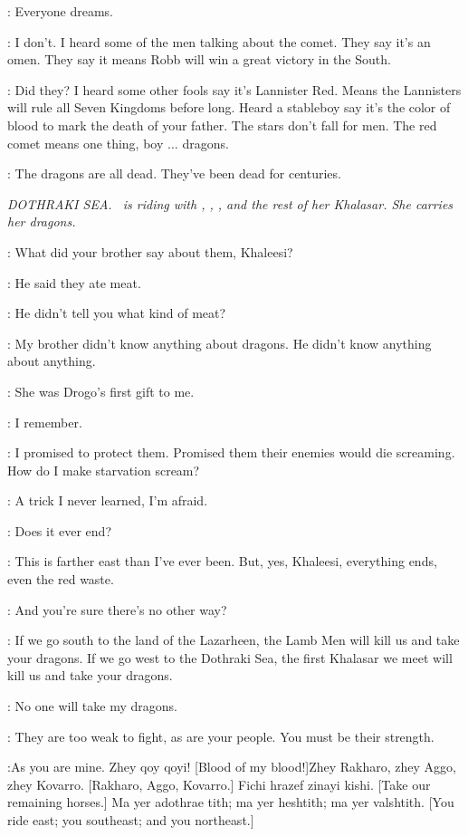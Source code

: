 \OSHA: Everyone dreams.

\BRAN: I don't. I heard some of the men talking about the comet. They say it's an omen. They say it means Robb will win a great victory in the South.

\OSHA: Did they? I heard some other fools say it's Lannister Red. Means the Lannisters will rule all Seven Kingdoms before long. Heard a stableboy say it's the color of blood to mark the death of your father. The stars don't fall for men. The red comet means one thing, boy $\ldots$ dragons.

\BRAN: The dragons are all dead. They've been dead for centuries.


\scene

\textit{DOTHRAKI SEA. \DAENERYS ~is riding with \DOREAH, \JORAH, \RAKHARO, and the rest of her Khalasar.  She carries her dragons.}

\DOREAH: What did your brother say about them, Khaleesi?

\DAENERYS: He said they ate meat.

\DOREAH: He didn't tell you what kind of meat?

\DAENERYS: My brother didn't know anything about dragons. He didn't know anything about anything.


\DAENERYS: She was Drogo's first gift to me.

\JORAH: I remember.

\DAENERYS: I promised to protect them. Promised them their enemies would die screaming. How do I make starvation scream?

\JORAH: A trick I never learned, I'm afraid.

\DAENERYS: Does it ever end?

\JORAH: This is farther east than I've ever been. But, yes, Khaleesi, everything ends, even the red waste.

\DAENERYS: And you're sure there's no other way?

\JORAH: If we go south to the land of the Lazarheen, the Lamb Men will kill us and take your dragons. If we go west to the Dothraki Sea, the first Khalasar we meet will kill us and take your dragons.

\DAENERYS: No one will take my dragons.

\JORAH: They are too weak to fight, as are your people. You must be their strength.

\DAENERYS:As you are mine.  Zhey qoy qoyi! [Blood of my blood!]Zhey Rakharo, zhey Aggo, zhey Kovarro. [Rakharo, Aggo, Kovarro.] Fichi hrazef zinayi kishi. [Take our remaining horses.] Ma yer adothrae tith; ma yer heshtith; ma yer valshtith. [You ride east; you southeast; and you northeast.]

